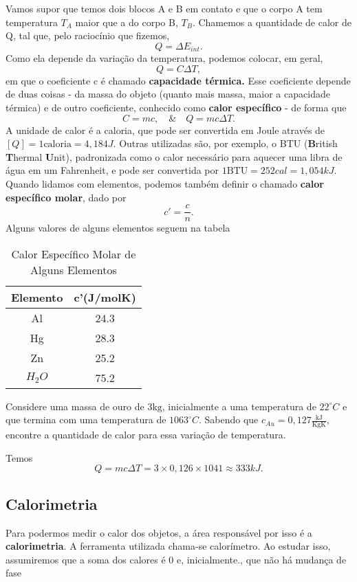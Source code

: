 \documentclass[PhysicsII/phsyicsII_notes.tex]{subfiles}
\begin{document}
Vamos supor que temos dois blocos A e B em contato e que o corpo A tem temperatura \(T_{A} \) maior que a do corpo B, \(T_{B}\).
Chamemos a quantidade de calor de Q, tal que, pelo raciocínio que fizemos,
\[
	Q = \Delta E_{int}.
\]
Como ela depende da variação da temperatura, podemos colocar, em geral,
\[
	Q = C\Delta T,
\]
em que o coeficiente c é chamado \textbf{capacidade térmica.} Esse coeficiente depende de duas coisas - da massa do objeto (quanto mais massa, maior a capacidade térmica)
e de outro coeficiente, conhecido como \textbf{calor específico} - de forma que
\[
	C = mc,\quad \&\quad Q = mc\Delta T.
\]
A unidade de calor é a caloria, que pode ser convertida em Joule através de \([Q] = 1\text{caloria} = 4,184J.\) Outras utilizadas são, por exemplo,
o BTU (\textbf{B}ritish \textbf{T}hermal \textbf{U}nit), padronizada como o calor necessário para aquecer uma libra de água em um Fahrenheit, e pode ser convertida por
\(1\text{BTU} = 252cal = 1,054kJ.\) Quando lidamos com elementos, podemos também definir o chamado \textbf{calor específico molar}, dado por
\[
	c'= \frac{c}{n}.
\]
Alguns valores de alguns elementos seguem na tabela
\begin{center}
	\begin{table}[h!]
		\caption{Calor Específico Molar de Alguns Elementos}
		\centering
		\begin{tabular}{| c | c |}
			\hline
			Elemento   & c'(J/molK) \\
			\hline
			Al         & 24.3       \\
			Hg         & 28.3       \\
			Zn         & 25.2       \\
			\(H_{2}O\) & 75.2       \\
			\hline
		\end{tabular}
	\end{table}
\end{center}
\begin{example}
	Considere uma massa de ouro de \(3\text{kg}\), inicialmente a uma temperatura de \(22^{\circ{}}C\) e que termina com
	uma temperatura de \(1063^{\circ{}}C\). Sabendo que \(c_{Au}=0,127\frac{\text{kJ}}{\text{KgK}},\) encontre a quantidade de calor para essa
	variação de temperatura.

	Temos
	\[
		Q = mc\Delta T = 3\times 0,126\times 1041\approx 333kJ.
	\]
\end{example}
\subsection{Calorimetria}
Para podermos medir o calor dos objetos, a área responsável por isso é a \textbf{calorimetria}. A ferramenta utilizada chama-se calorímetro.
Ao estudar isso, assumiremos que a soma dos calores é 0 e, inicialmente., que não há mudança de fase
\end{document}
